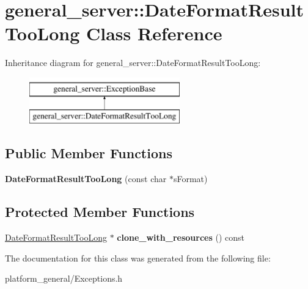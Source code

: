 \hypertarget{classgeneral__server_1_1DateFormatResultTooLong}{\section{general\-\_\-server\-:\-:\-Date\-Format\-Result\-Too\-Long \-Class \-Reference}
\label{classgeneral__server_1_1DateFormatResultTooLong}
}
\-Inheritance diagram for general\-\_\-server\-:\-:\-Date\-Format\-Result\-Too\-Long\-:\begin{figure}[H]
\begin{center}
\leavevmode
\includegraphics[height=2.000000cm]{classgeneral__server_1_1DateFormatResultTooLong}
\end{center}
\end{figure}
\subsection*{\-Public \-Member \-Functions}
\begin{DoxyCompactItemize}
\item 
\hypertarget{classgeneral__server_1_1DateFormatResultTooLong_a700f550993ecd065c75ac13421f5a7de}{{\bfseries \-Date\-Format\-Result\-Too\-Long} (const char $\ast$s\-Format)}\label{classgeneral__server_1_1DateFormatResultTooLong_a700f550993ecd065c75ac13421f5a7de}

\end{DoxyCompactItemize}
\subsection*{\-Protected \-Member \-Functions}
\begin{DoxyCompactItemize}
\item 
\hypertarget{classgeneral__server_1_1DateFormatResultTooLong_ace891404c94bbd87c5416cc82d974e1d}{\hyperlink{classgeneral__server_1_1DateFormatResultTooLong}{\-Date\-Format\-Result\-Too\-Long} $\ast$ {\bfseries clone\-\_\-with\-\_\-resources} () const }\label{classgeneral__server_1_1DateFormatResultTooLong_ace891404c94bbd87c5416cc82d974e1d}

\end{DoxyCompactItemize}


\-The documentation for this class was generated from the following file\-:\begin{DoxyCompactItemize}
\item 
platform\-\_\-general/\-Exceptions.\-h\end{DoxyCompactItemize}
